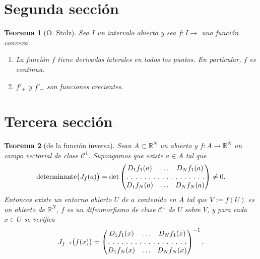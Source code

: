 \documentclass[11pt]{article}
\numberwithin{equation}{section} %
\DeclareMathOperator{\deter}{determinante}
\theoremstyle{plain}                            %
\newtheorem{teorema}{Teorema}[section]
\theoremstyle{definition}                       %
\theoremstyle{remark}                           %
\begin{document}
\section{Segunda sección}


\begin{teorema}[O. Stolz] \label{th:cc}
      Sea $I$ un intervalo abierto y sea $f \colon I \rightarrow$ una función convexa.
      \begin{enumerate}
            \item La función $f$ tiene derivadas laterales en todos los puntos. En particular, $f$ es continua.
            \item $f'_{+}$ y $f'_{-}$ son funciones crecientes.
      \end{enumerate}
\end{teorema}

\section{Tercera sección}

\begin{teorema}[de la función inversa]\label{th:inversa}
      Sean $A\subset \mathbb{R}^N$ un abierto y $f\colon A\rightarrow \mathbb{R}^{N}$ un campo vectorial de clase
      $\mathcal{C}^1$. Supongamos que existe $a\in A$ tal que
      \[
            \deter \bigl (J_f(a)\bigr )=\det
            \left(
            \begin{matrix}
                        D_1 f_1 (a) & \dotsc & D_{N} f_{1}(a) \\
                        \hdotsfor[2]{3}                       \\
                        D_1f_N(a)   & \dotsc & D_N f_N(a)
                  \end{matrix}
            \right)
            \neq 0.
      \]
      Entonces existe un entorno abierto $U$ de $a$ contenido en $A$ tal que $V:=f(U)$ es un abierto de $\mathbb{R}^N$, $f$ es un difeomorfismo de clase $\mathcal{C}^1$ de $U$ sobre $V$, y para cada $x\in U$ se verifica
      \[
            J_{f^{-1}}\bigl (f(x)\bigr )=
            \begin{pmatrix}
                  D_1f_1(x) & \dotsc & D_Nf_1(x) \\
                  \hdotsfor[2]{3}                \\
                  D_1f_N(x) & \dotsc & D_Nf_N(x)
            \end{pmatrix}^{-1}.
      \]
\end{teorema}
\end{document}
